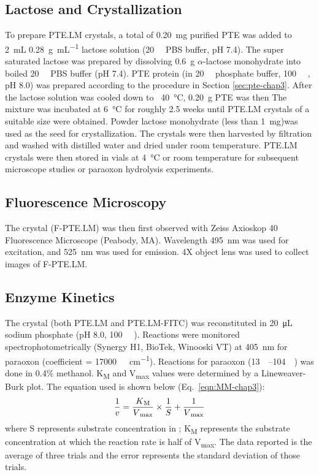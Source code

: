 \begin{refsection}
\subsection{Lactose and Crystallization}

To prepare PTE.LM crystals, a total of \SI{0.20}{\milli\gram} purified PTE was
added to \SI{2}{\mL} \SI{0.28}{\gram\per\mL} lactose solution
(\SI{20}{\milli\Molar} PBS buffer, pH 7.4). The super saturated lactose was
prepared by dissolving \SI{0.6}{\gram} $\alpha$-lactose monohydrate into boiled
\SI{20}{\milli\Molar} PBS buffer (pH 7.4). PTE protein (in
\SI{20}{\milli\Molar} phosphate buffer, \SI{100}{\micro\Molar} , pH
8.0) was prepared according to the procedure in Section \ref{sec:pte-chap3}.
After the lactose solution was cooled down to ~\SI{40}{\celsius},
\SI{0.20}{\gram} PTE was then The mixture was incubated at \SI{6}{\celsius} for
roughly 2.5 weeks until PTE.LM crystals of a suitable size were obtained.
Powder lactose monohydrate (less than \SI{1}{\mg})was used as the seed for
crystallization. The crystals were then harvested by filtration and washed with
distilled water and dried under room temperature. PTE.LM crystals were then
stored in vials at \SI{4}{\celsius} or room temperature for subsequent
microscope studies or paraoxon hydrolysis experiments.

\subsection{Fluorescence Microscopy}

The crystal (F-PTE.LM) was then first observed with Zeiss Axioskop 40
Fluorescence Microscope (Peabody, MA).  Wavelength \SI{495}{\nm} was used for
excitation, and \SI{525}{\nm} was used for emission. 4X object lens was used to
collect images of F-PTE.LM.

\subsection{Enzyme Kinetics}

The crystal (both PTE.LM and PTE.LM-FITC) was reconstituted in
\SI{20}{\micro\liter} sodium phosphate (pH 8.0, \SI{100}{\micro\Molar}
). Reactions were monitored spectrophotometrically (Synergy H1,
BioTek, Winooski VT) at \SI{405}{\nm} for paraoxon (coefficient =
\SI{17000}{\per\Molar\per\cm}).  Reactions for paraoxon
(\SIrange{13}{104}{\micro\Molar}) was done in 0.4\% methanol.
K\textsubscript{M} and V\textsubscript{max} values were determined by a
Lineweaver-Burk plot.\cite{Baker2011b} The equation used is shown below
(Eq.~\ref{eqn:MM-chap3}): 
\begin{equation} 
    \frac{1}{v} =
    \frac{K\textsubscript{M}}{V\textsubscript{max}}\times\frac{1}{S} +
    \frac{1}{V\textsubscript{max}} 
    \label{eqn:MM-chap3}
\end{equation}
where S represents substrate concentration in \si{\Molar}; K\textsubscript{M}
represents the substrate concentration at which the reaction rate is half of
V\textsubscript{max}. The data reported is the average of three trials and the
error represents the standard deviation of those trials.


\end{refsection}
